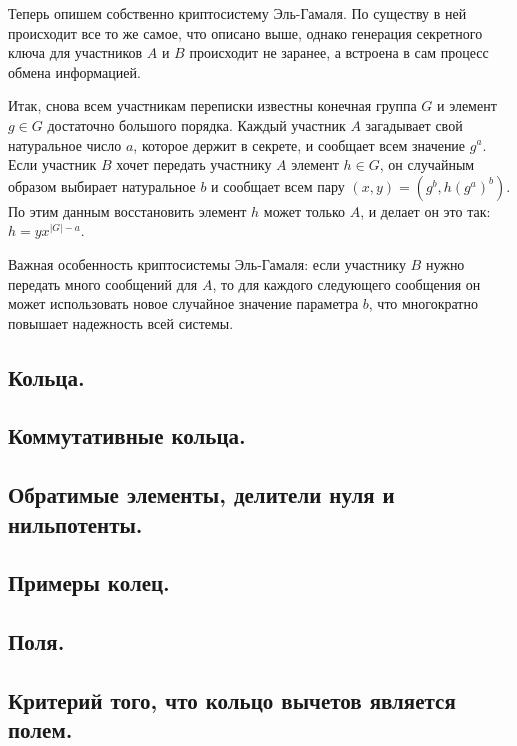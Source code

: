 Теперь опишем собственно криптосистему Эль-Гамаля.
По существу в ней происходит все то же самое, что описано выше,
однако генерация секретного ключа для участников $A$ и $B$ происходит
не заранее, а встроена в сам процесс обмена информацией.

Итак, снова всем участникам переписки известны конечная группа $G$ и
элемент $g \in G$ достаточно большого порядка. Каждый участник 
$A$ загадывает свой натуральное число $a$, которое держит в секрете, и
сообщает всем значение $g^{a}$. Если участник $B$ хочет передать участнику
$A$ элемент $h \in G$, он случайным образом выбирает натуральное $b$ и сообщает
всем пару $(x, y) = (g^b, h(g^{a})^{b})$. По этим данным восстановить элемент
$h$ может только $A$, и делает он это так: $h = yx^{|G| - a}$.

Важная особенность криптосистемы Эль-Гамаля: если участнику $B$ нужно
передать много сообщений для $A$, то для каждого следующего сообщения он может
использовать новое случайное значение параметра $b$, что многократно повышает
надежность всей системы.

\newpage
\mysection
\subsection{Кольца.}
\subsection{Коммутативные кольца.}
\subsection{Обратимые элементы, делители нуля и нильпотенты.}
\subsection{Примеры колец.}
\subsection{Поля.}
\subsection{Критерий того, что кольцо вычетов является полем.}



